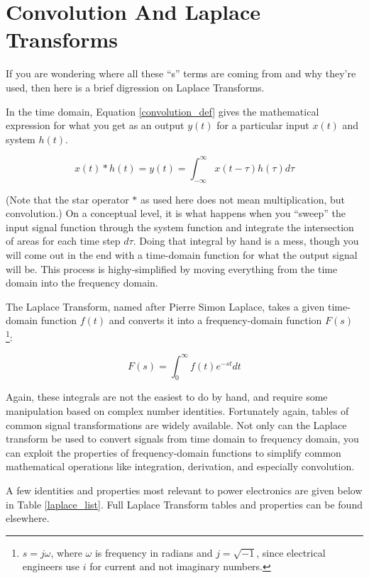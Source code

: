 \section{Convolution And Laplace Transforms}

If you are wondering where all these ``s'' terms are coming from and why they're used, then here is a brief digression on Laplace Transforms.

In the time domain, Equation \ref{convolution_def} gives the mathematical expression for what you get as an output $y(t)$ for a particular input $x(t)$ and system $h(t)$.

\begin{equation}
x(t) * h(t) = y(t) = \int^\infty_{-\infty}x(t-\tau)h(\tau)d\tau
\label{convolution_def}
\end{equation}

(Note that the star operator $*$ as used here does not mean multiplication, but convolution.) On a conceptual level, it is what happens when you ``sweep'' the input signal function through the system function and integrate the intersection of areas for each time step $d\tau$. Doing that integral by hand is a mess, though you will come out in the end with a time-domain function for what the output signal will be. This process is highy-simplified by moving everything from the time domain into the frequency domain.

The Laplace Transform, named after Pierre Simon Laplace, takes a given time-domain function $f(t)$ and converts it into a frequency-domain function $F(s)$ \footnote{$s=j\omega$, where $\omega$ is frequency in radians and $j = \sqrt{-1}$, since electrical engineers use $i$ for current and not imaginary numbers.}:

\begin{equation}
F(s) = \int^\infty_0 f(t)e^{-st}dt
\label{laplace_def}
\end{equation}

Again, these integrals are not the easiest to do by hand, and require some manipulation based on complex number identities. Fortunately again, tables of common signal transformations are widely available. Not only can the Laplace transform be used to convert signals from time domain to frequency domain, you can exploit the properties of frequency-domain functions to simplify common mathematical operations like integration, derivation, and especially convolution.

A few identities and properties most relevant to power electronics are given below in Table \ref{laplace_list}. Full Laplace Transform tables and properties can be found elsewhere. 

